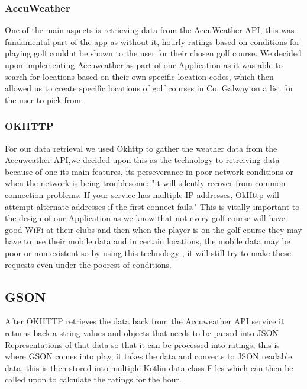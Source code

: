 \subsubsection{AccuWeather}
One of the main aspects is retrieving data from the AccuWeather API, this was fundamental part of the app as without it, hourly ratings based on conditions for playing golf couldnt be shown to the user for their chosen golf course. We decided upon implementing Accuweather as part of our Application as it was able to search for locations based on their own specific location codes, which then allowed us to create specific locations of golf courses in Co. Galway on a list for the user to pick from.

\subsubsection{OKHTTP}
For our data retrieval we used Okhttp to gather the weather data from the Accuweather API,we decided upon this as the technology to retreiving data because of one its main features, its perseverance in poor network conditions or when the network is being troublesome: "it will silently recover from common connection problems. If your service has multiple IP addresses, OkHttp will attempt alternate addresses if the first connect fails."\cite{ref1}
\newline
\newline
This is vitally important to the design of our Application as we know that not every golf course will have good WiFi at their clubs and then when the player is on the golf course they may have to use their mobile data and in certain locations, the mobile data may be poor or non-existent so by using this technology , it will still try to make these requests even under the poorest of conditions.

\subsection{GSON}
After OKHTTP retrieves the data back from the Accuweather API service it returns back a string values and objects that needs to be parsed into JSON Representations of that data so that it can be processed into ratings, this is where GSON comes into play, it takes the data and converts to JSON readable data, this is then stored into multiple Kotlin data class Files which can then be called upon to calculate the ratings for the hour.
